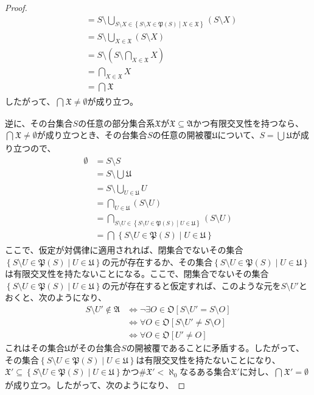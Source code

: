 \documentclass[dvipdfmx]{jsarticle}
\begin{document}
\begin{proof}
\begin{align*}
&= S \setminus \bigcup_{S \setminus X \in \left\{ S \setminus X \in \mathfrak{P}(S) \middle| X\in \mathfrak{X} \right\}} (S \setminus X)\\
&= S \setminus \bigcup_{X \in \mathfrak{X}} (S \setminus X)\\
&= S \setminus \left( S \setminus \bigcap_{X \in \mathfrak{X}} X \right)\\
&= \bigcap_{X \in \mathfrak{X}} X\\
&= \bigcap_{} \mathfrak{X}
\end{align*}
したがって、$\bigcap_{} \mathfrak{X} \neq \emptyset$が成り立つ。\par
逆に、その台集合$S$の任意の部分集合系$\mathfrak{X}$が$\mathfrak{X \subseteq A}$かつ有限交叉性を持つなら、$\bigcap_{} \mathfrak{X} \neq \emptyset$が成り立つとき、その台集合$S$の任意の開被覆$\mathfrak{U}$について、$S = \bigcup_{} \mathfrak{U}$が成り立つので、
\begin{align*}
\emptyset &= S \setminus S\\
&= S \setminus \bigcup_{} \mathfrak{U}\\
&= S \setminus \bigcup_{U \in \mathfrak{U}} U\\
&= \bigcap_{U \in \mathfrak{U}} (S \setminus U)\\
&= \bigcap_{S \setminus U \in \left\{ S \setminus U \in \mathfrak{P}(S) \middle| U \in \mathfrak{U} \right\}} (S \setminus U)\\
&= \bigcap_{} \left\{ S \setminus U \in \mathfrak{P}(S) \middle| U \in \mathfrak{U} \right\}
\end{align*}
ここで、仮定が対偶律に適用されれば、閉集合でないその集合$\left\{ S \setminus U \in \mathfrak{P}(S) \middle| U \in \mathfrak{U} \right\}$の元が存在するか、その集合$\left\{ S \setminus U \in \mathfrak{P}(S) \middle| U \in \mathfrak{U} \right\}$は有限交叉性を持たないことになる。ここで、閉集合でないその集合$\left\{ S \setminus U \in \mathfrak{P}(S) \middle| U \in \mathfrak{U} \right\}$の元が存在すると仮定すれば、このような元を$S \setminus U'$とおくと、次のようになり、
\begin{align*}
S \setminus U'\mathfrak{\notin A} &\Leftrightarrow \neg\exists O \in \mathfrak{O}\left[ S \setminus U' = S \setminus O \right]\\
&\Leftrightarrow \forall O \in \mathfrak{O}\left[ S \setminus U' \neq S \setminus O \right]\\
&\Leftrightarrow \forall O \in \mathfrak{O}\left[ U' \neq O \right]
\end{align*}
これはその集合$\mathfrak{U}$がその台集合$S$の開被覆であることに矛盾する。したがって、その集合$\left\{ S \setminus U \in \mathfrak{P}(S) \middle| U \in \mathfrak{U} \right\}$は有限交叉性を持たないことになり、$\mathfrak{X}' \subseteq \left\{ S \setminus U \in \mathfrak{P}(S) \middle| U \in \mathfrak{U} \right\}$かつ${\#}\mathfrak{X}' < \aleph_{0}$なるある集合$\mathfrak{X}'$に対し、$\bigcap_{} \mathfrak{X}' = \emptyset$が成り立つ。したがって、次のようになり、

\end{proof}
\end{document}
